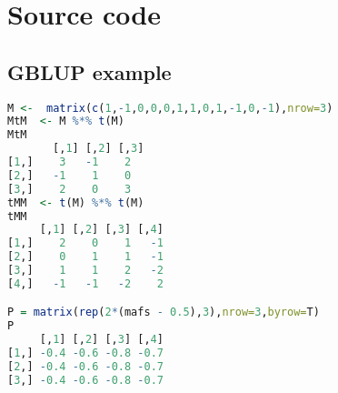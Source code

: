 

\chapter{Source code} %

\label{AppendixA} %
\section{GBLUP example}
\linespread{1.5} 

\begin{lstlisting}[language=R]
M <-  matrix(c(1,-1,0,0,0,1,1,0,1,-1,0,-1),nrow=3)
MtM  <- M %*% t(M)
MtM
       [,1] [,2] [,3]
[1,]    3   -1    2
[2,]   -1    1    0
[3,]    2    0    3
tMM  <- t(M) %*% t(M)
tMM
     [,1] [,2] [,3] [,4]
[1,]    2    0    1   -1
[2,]    0    1    1   -1
[3,]    1    1    2   -2
[4,]   -1   -1   -2    2

P = matrix(rep(2*(mafs - 0.5),3),nrow=3,byrow=T)
P
     [,1] [,2] [,3] [,4]
[1,] -0.4 -0.6 -0.8 -0.7
[2,] -0.4 -0.6 -0.8 -0.7
[3,] -0.4 -0.6 -0.8 -0.7



\end{lstlisting}


\linespread{1.5} 
